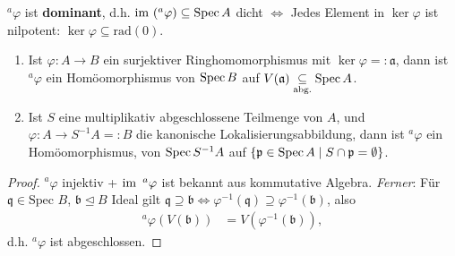 \begin{cor}
\label{cor:charakterisierung-dominanz-auf-spec}	
  $^{a}\varphi$ ist \textbf{dominant},
  d.h. $\im\ (^{a}\varphi)\subseteq\Spec A$ dicht
  $\iff$ Jedes Element in $\ker\varphi$ ist nilpotent:
  $\ker\varphi\subseteq\text{rad}(0)$.
\end{cor}

\begin{prop} \mbox{}
\label{prop:spec-quotienten-lokalisierung}	
  \begin{enumerate}
  \item Ist $\varphi:A\rightarrow B$ ein surjektiver
    Ringhomomorphismus mit $\ker\varphi=:\mathfrak{a}$, dann ist
    $^{a}\varphi$ ein Homöomorphismus von $\operatorname{Spec} B$ auf
    $V(\mathfrak{a})\underset{\text{abg.}}{\subseteq}\operatorname{Spec} A$.
  \item Ist $S$ eine multiplikativ abgeschlossene Teilmenge von $A$,
    und $\varphi:A\longrightarrow S^{-1}A=:B$ die kanonische
    Lokalisierungsabbildung, dann ist $^{a}\varphi$ ein
    Homöomorphismus, von $\operatorname{Spec} S^{-1}A$ auf $\{\mathfrak{p}\in\operatorname{Spec} A\mid
    S\cap\mathfrak{p}=\emptyset\}$.
  \end{enumerate}
\end{prop}

\begin{proof}
  $^{a}\varphi$ injektiv + $\operatorname{\mathrm{im}}\ ^{a}\varphi$ ist bekannt aus kommutative Algebra.
  \emph{Ferner}: Für $\mathfrak{q}\in\text{Spec }B$,
  $\mathfrak{b}\unlhd B$ Ideal gilt
  $\mathfrak{q}\supseteq\mathfrak{b}\Leftrightarrow
  \varphi^{-1}(\mathfrak{q})\supseteq\varphi^{-1}(\mathfrak{b})$, also
  \begin{align*}
    ^{a}\varphi(V(\mathfrak{b})) & =V(\varphi^{-1}(\mathfrak{b})),
  \end{align*}
  d.h. $^{a}\varphi$ ist abgeschlossen.
\end{proof}
